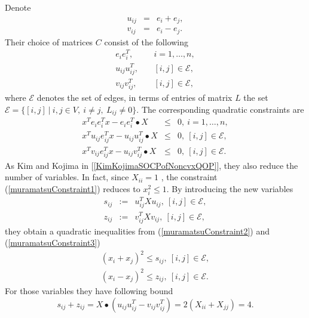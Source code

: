 \documentclass[12pt]{book}
\theoremstyle{definition}
\begin{document}
Denote 
\begin{eqnarray*}
u_{ij} &=& e_i + e_j, \\
v_{ij} &=& e_i - e_j.
\end{eqnarray*}
Their choice of matrices $C$ consist of the following 
\begin{eqnarray*}
e_ie_i^T, &\ & i = 1,\dots,n, \\
u_{ij}u_{ij}^T, &\ & [i,j]\in \mathcal{E}, \\
v_{ij}v_{ij}^T, &\ & [i,j]\in \mathcal{E},
\end{eqnarray*}
where $\mathcal{E}$ denotes the set of edges, in terms of entries of matrix $L$ the set $\mathcal{E} = \{[i,j] \ \vert \ i,j\in V,\ i\neq j, \ L_{ij}\neq 0\}$.
The corresponding quadratic constraints are 
\begin{eqnarray}
\label{muramatsuConstraint1}
x^Te_ie_i^Tx - e_ie_i^T\bullet X &\leq & 0, \ i = 1,\dots,n,\\ 
\label{muramatsuConstraint2}
x^Tu_{ij}e_{ij}^Tx - u_{ij}u_{ij}^T\bullet X &\leq & 0, \ [i,j]\in \mathcal{E},\\ 
\label{muramatsuConstraint3}
x^Tv_{ij}e_{ij}^Tx - u_{ij}v_{ij}^T\bullet X &\leq & 0, \ [i,j]\in \mathcal{E}. 
\end{eqnarray}
As Kim and Kojima in [\ref{KimKojimaSOCPofNoncvxQOP}], they also reduce the number of variables. In fact, since $X_{ii} = 1$ , the constraint (\ref{muramatsuConstraint1}) reduces to $x_i^2 \leq 1$.
By introducing the new variables 
\begin{eqnarray*}
s_{ij} &:= & u_{ij}^TXu_{ij},\ [i,j]\in \mathcal{E}, \\ 
z_{ij} &:= & v_{ij}^TXv_{ij},\ [i,j]\in \mathcal{E}, 
\end{eqnarray*}
they obtain a quadratic inequalities from (\ref{muramatsuConstraint2}) and (\ref{muramatsuConstraint3})
\begin{eqnarray*}
(x_i + x_j)^2 \leq s_{ij}, \ [i,j]\in \mathcal{E}, \\
(x_i - x_j)^2 \leq z_{ij}, \ [i,j]\in \mathcal{E}. 
\end{eqnarray*}
For those variables they have following bound
\begin{equation*}
s_{ij} + z_{ij} = X\bullet(u_{ij}u_{ij}^T - v_{ij}v_{ij}^T) = 2(X_{ii} + X_{jj}) = 4.
\end{equation*}
\end{document}
